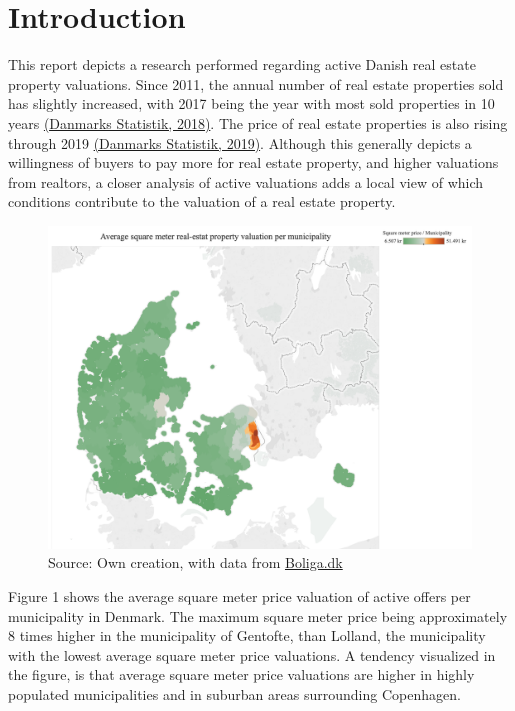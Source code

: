 \documentclass[12pt,a4paper]{article}
\begin{document}

\newpage
\onehalfspacing

\tableofcontents
\newpage
\section{Introduction}
This report depicts a research performed regarding active Danish real estate property valuations. Since 2011, the annual number of real estate properties sold has slightly increased, with 2017 being the year with most sold properties in 10 years \href{https://www.dst.dk/da/Statistik/nyt/NytHtml?cid=27979}{(Danmarks Statistik, 2018)}. The price of real estate properties is also rising through 2019 \href{https://www.dst.dk/da/Statistik/nyt/NytHtml?cid=28741}{(Danmarks Statistik, 2019)}. Although this generally depicts a willingness of buyers to pay more for real estate property, and higher valuations from realtors, a closer analysis of active valuations adds a local view of which conditions contribute to the valuation of a real estate property. \newline
\newcommand{\source}[1]{\caption*{Source: {#1}} }\begin{figure}[H]
\centering
\caption{}
\includegraphics[scale=0.4]{123.png}
\source{Own creation, with data from \href{https://www.boliga.dk}{Boliga.dk}}
\end{figure}

Figure 1 shows the average square meter price valuation of active offers per municipality in Denmark. The maximum square meter price being approximately 8 times higher in the municipality of Gentofte, than Lolland, the municipality with the lowest average square meter price valuations. A tendency visualized in the figure, is that average square meter price valuations are higher in highly populated municipalities and in suburban areas surrounding Copenhagen. \newline
\end{document}
